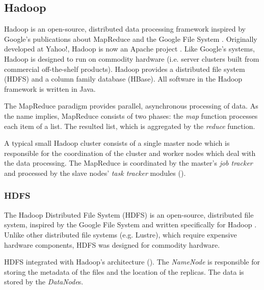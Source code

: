 
\subsection{Hadoop}

Hadoop is an open-source, distributed data processing framework inspired by Google's publications about MapReduce \cite{Dean:2008:MSD:1327452.1327492} and the Google File System \cite{Ghemawat:2003:GFS:945445.945450}. Originally developed at Yahoo!, Hadoop is now an Apache project \cite{Hadoop}. Like Google's systems, Hadoop is designed to run on commodity hardware (i.e. server clusters built from commercial off-the-shelf products). Hadoop provides a distributed file system (HDFS) and a column family database (HBase). All software in the Hadoop framework is written in Java.

The MapReduce paradigm provides parallel, asynchronous processing of data. As the name implies, MapReduce consists of two phases: the \emph{map} function processes each item of a list. The resulted list, which is aggregated by the \emph{reduce} function.

A typical small Hadoop cluster consists of a single master node which is responsible for the coordination of the cluster and worker nodes which deal with the data processing. The MapReduce is coordinated by the master's \emph{job tracker} and processed by the slave nodes' \emph{task tracker} modules ().


\subsubsection{HDFS}

The Hadoop Distributed File System (HDFS) is an open-source, distributed file system, inspired by the Google File System and written specifically for Hadoop \cite{Hadoop}. Unlike other distributed file systems (e.g. Lustre), which require expensive hardware components, HDFS was designed for commodity hardware.

HDFS integrated with Hadoop's architecture (). The \emph{NameNode} is responsible for storing the metadata of the files and the location of the replicas. The data is stored by the \emph{DataNode}s.


